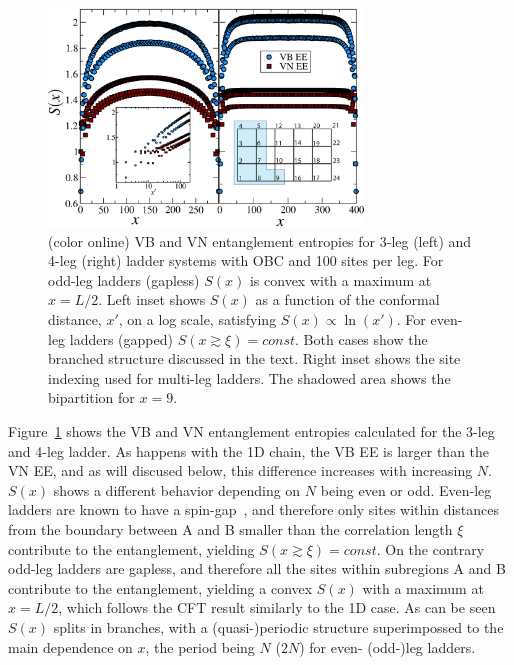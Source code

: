 \documentclass[prl,aps,twocolumn,floatfix,amsmath,amssymb,superscriptaddress,tightenlines]{revtex4}
\begin{document}
\begin{figure} { \includegraphics[width=3.3in]{FIG23NEW.eps} 
\caption{(color online) VB and VN entanglement entropies for 3-leg (left)
and 4-leg (right) ladder systems with OBC and 100 sites per leg.  For
odd-leg ladders (gapless) $S(x)$ is convex with a maximum at $x=L/2$.
Left inset shows $S(x)$ as a function of the conformal distance, $x'$, on
a log scale, satisfying $S(x)\propto\ln(x')$. For even-leg ladders
(gapped) $S(x\gtrsim\xi)=const.$ Both cases show the branched structure
discussed in the text. Right inset shows the site indexing used for
multi-leg ladders. The shadowed area shows the bipartition for $x=9$.
\label{ladder} }} \end{figure}

Figure~\ref{ladder} shows the VB and VN entanglement entropies calculated
for the 3-leg and 4-leg ladder. As happens with the 1D chain, the VB EE is
larger than the VN EE, and as will discused below, this difference
increases with increasing $N$. $S(x)$ shows a different behavior depending
on $N$ being even or odd. Even-leg ladders are known to have a
spin-gap~\cite{White1994}, and therefore only sites within distances from
the boundary between A and B smaller than the correlation length $\xi$
contribute to the entanglement, yielding $S(x\gtrsim \xi)=const.$ On the
contrary odd-leg ladders are gapless, and therefore all the sites within
subregions A and B contribute to the entanglement, yielding a convex
$S(x)$ with a maximum at $x=L/2$, which follows the CFT result similarly
to the 1D case. As can be seen $S(x)$ splits in branches, with a
(quasi-)periodic structure superimpossed to the main dependence on $x$,
the period being $N$ ($2N$) for even- (odd-)leg ladders. 
\end{document}

